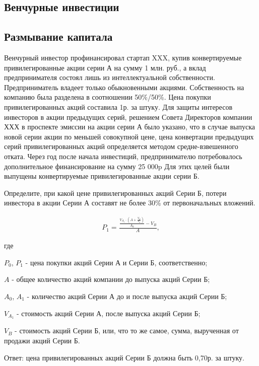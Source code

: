 \documentclass[12pt, table, a4paper,twoside]{exam}
\begin{document}
\begin{questions}
\section{Венчурные инвестиции}
\subsection{Размывание капитала}
\question[20]
Венчурный инвестор профинансировал стартап XXX, купив конвертируемые привилегированные акции серии А на сумму 1 млн. руб., а вклад предпринимателя состоял лишь из интеллектуальной собственности. Предприниматель владеет только обыкновенными акциями. Собственность на компанию была разделена в соотношении 50\%/50\%. Цена покупки привилегированных акций составила 1р. за штуку.
Для защиты интересов инвесторов в акции предыдущих серий, решением Совета Директоров компании ХХХ в проспекте эмиссии на акции серии А было указано, что в случае выпуска новой серии акции по меньшей совокупной цене, цена конвертации предыдущих серий привилегированных акций определяется методом средне-взвешенного отката.
Через год после начала инвестиций, предпринимателю потребовалось дополнительное финансирование на сумму  25 000p
Для этих целей были выпущены конвертируемые привилегированные акции серии Б.
\noaddpoints
\begin{subparts}
	\subpart[10] Определите, при какой цене привилегированных акций Серии Б, потери инвестора в акции Серии А составят не более 30\% от первоначальных вложений.
	\begin{solution}[18em]
		\begin{align}
		P_1=\frac{\frac{V_{A_1} \cdot (A + \frac{V_B}{P_0})}{A_0}-V_B}{A},
		\end{align}
		
		где
		
		$P_0$, $P_1$ - цена покупки акций Серии А и Серии Б, соответственно;
		
		$A$ - общее количество акций компании до выпуска акций Серии Б;
		
		$A_0$, $A_1$ - количество акций Серии А до и после выпуска акций Серии Б;
		
		$V_{A_1}$ - стоимость акций Серии А, после выпуска акций Серии Б;
		
		$V_B$ - стоимость акций Серии Б, или, что то же самое, сумма, вырученная от продажи акций Серии Б.
		
		Ответ: цена привилегированных акций Серии Б должна быть 0,70р. за штуку.					
	\end{solution}
	

\end{subparts}
\end{questions}
\end{document}

